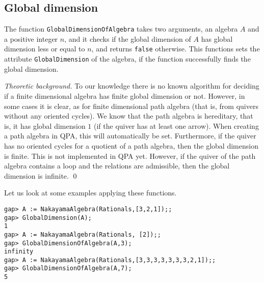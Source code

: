 \documentclass{amsart}
\theoremstyle{definition}
\newcommand{\code}[1]{\texttt{#1}}
\theoremstyle{theoretic}
\newenvironment{theoback}
{\medskip\small\textit{Theoretic background.} }
{\qed\par\medskip}
\begin{document}
\subsection{Global dimension}
The function \code{GlobalDimensionOfAlgebra} takes two arguments, an
algebra $A$ and a positive integer $n$, and it checks if the global
dimension of $A$ has global dimension less or equal to $n$, and
returns \code{false} otherwise.  This functions sets the attribute
\code{GlobalDimension} of the algebra, if the function successfully
finds the global dimension. 

\begin{theoback}
  To our knowledge there is no known algorithm for deciding if a
  finite dimensional algebra has finite global dimension or not.
  However, in some cases it is clear, as for finite dimensional path
  algebra (that is, from quivers without any oriented cycles).  We
  know that the path algebra is hereditary, that is, it has global
  dimension $1$ (if the quiver has at least one arrow).  When creating
  a path algebra in QPA, this will automatically be set.
  Furthermore, if the quiver has no oriented cycles for a quotient of
  a path algebra, then the global dimension is finite.  This is not
  implemented in QPA yet.  However, if the quiver of the path algebra
  contains a loop and the relations are admissible, then the global
  dimension is infinite.
\end{theoback}

Let us look at some examples applying these functions.
\begin{verbatim}
gap> A := NakayamaAlgebra(Rationals,[3,2,1]);;
gap> GlobalDimension(A);
1
gap> A := NakayamaAlgebra(Rationals, [2]);;
gap> GlobalDimensionOfAlgebra(A,3);
infinity
gap> A := NakayamaAlgebra(Rationals,[3,3,3,3,3,3,3,2,1]);;
gap> GlobalDimensionOfAlgebra(A,7);
5
\end{verbatim}
\end{document}
